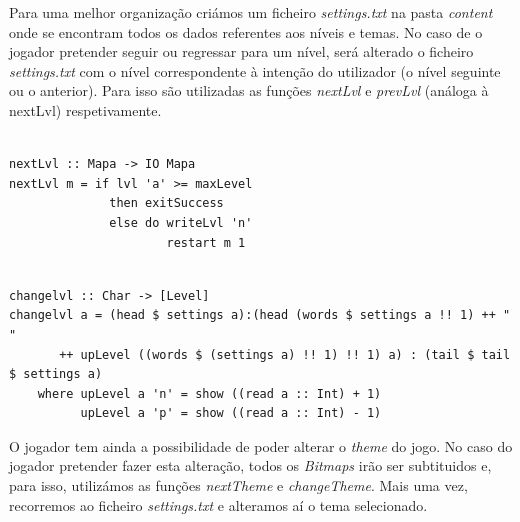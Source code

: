\documentclass[12pt,a4paper]{report}
\begin{document}
\hfill

Para uma melhor organização criámos um ficheiro \emph{settings.txt} na pasta \emph{content} onde se encontram todos os dados referentes aos níveis e temas. No caso de o jogador pretender seguir ou regressar para um nível, será alterado o ficheiro \emph{settings.txt} com o nível correspondente à intenção do utilizador (o nível seguinte ou o anterior). Para isso são utilizadas as funções \emph{nextLvl} e \emph{prevLvl} (análoga à nextLvl) respetivamente.

\hfill

\begin{verbatim}

nextLvl :: Mapa -> IO Mapa
nextLvl m = if lvl 'a' >= maxLevel
              then exitSuccess
              else do writeLvl 'n'
                      restart m 1
\end{verbatim}


\hfill

\begin{verbatim}

changelvl :: Char -> [Level]
changelvl a = (head $ settings a):(head (words $ settings a !! 1) ++ " " 
       ++ upLevel ((words $ (settings a) !! 1) !! 1) a) : (tail $ tail $ settings a)
    where upLevel a 'n' = show ((read a :: Int) + 1)
          upLevel a 'p' = show ((read a :: Int) - 1)

\end{verbatim}

\hfill

\hfill

O jogador tem ainda a possibilidade de poder alterar o \emph{theme} do jogo. No caso do jogador pretender fazer esta alteração, todos os \emph{Bitmaps} irão ser subtituidos e, para isso, utilizámos as funções \emph{nextTheme} e \emph{changeTheme}. Mais uma vez, recorremos ao ficheiro \emph{settings.txt} e alteramos aí o tema selecionado.\\
\end{document}
